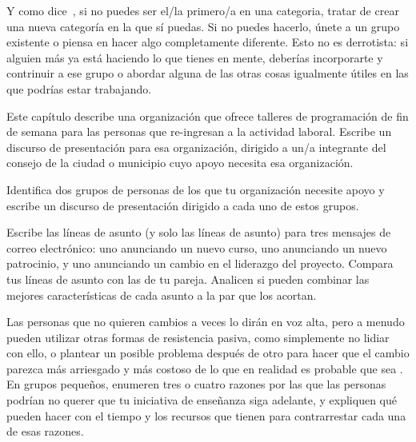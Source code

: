 Y como dice~\cite{Kuch2011},
si no puedes ser el/la primero/a en una categoria,
tratar de crear una nueva categoría en la que sí puedas.
Si no puedes hacerlo,
únete a un grupo existente o piensa en hacer algo completamente diferente.
Esto no es derrotista:
si alguien más ya está haciendo lo que tienes en mente,
deberías incorporarte y contrinuir a ese grupo o 
abordar alguna de las otras cosas igualmente útiles
en las que podrías estar trabajando.



Este capítulo describe una organización
que ofrece talleres de programación de fin de semana para las personas que re-ingresan a la actividad laboral.
Escribe un discurso de presentación para esa organización,
dirigido a un/a integrante del consejo de la ciudad o municipio cuyo apoyo necesita esa organización.


Identifica dos grupos de personas de los que tu organización necesite apoyo
y escribe un discurso de presentación dirigido a cada uno de estos grupos.


Escribe las líneas de asunto (y solo las líneas de asunto) para tres mensajes de correo electrónico:
uno anunciando un nuevo curso,
uno anunciando un nuevo patrocinio,
y uno anunciando un cambio en el liderazgo del proyecto.
Compara tus líneas de asunto con las de tu pareja.
Analicen  si pueden combinar las mejores características de cada asunto a la par que los acortan.


Las personas que no quieren cambios a veces lo dirán en voz alta,
pero a menudo pueden utilizar otras formas de resistencia pasiva,
como simplemente no lidiar con ello,
o plantear un posible problema después de otro 
para hacer que el cambio parezca más arriesgado 
y más costoso de lo que en realidad es probable que sea
\cite {Scot1987}.
En grupos pequeños,
enumeren tres o cuatro razones por las que las personas podrían no querer 
que tu iniciativa de enseñanza siga adelante,
y expliquen qué pueden hacer con el tiempo y los recursos que tienen 
para contrarrestar cada una de esas razones.



